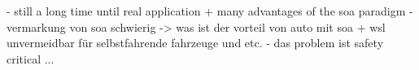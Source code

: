 - still a long time until real application
+ many advantages of the soa paradigm
- vermarkung von soa schwierig -> was ist der vorteil von auto mit soa
+ wsl unvermeidbar für selbstfahrende fahrzeuge und etc.
- das problem ist safety critical ...